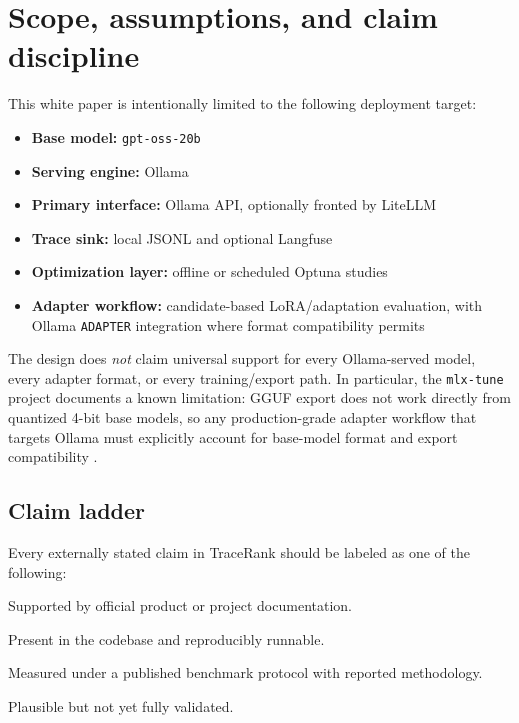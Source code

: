     \section{Scope, assumptions, and claim discipline}
    This white paper is intentionally limited to the following deployment target:
    \begin{itemize}
      \item \textbf{Base model:} \texttt{gpt-oss-20b}
      \item \textbf{Serving engine:} Ollama
      \item \textbf{Primary interface:} Ollama API, optionally fronted by LiteLLM
      \item \textbf{Trace sink:} local JSONL and optional Langfuse
      \item \textbf{Optimization layer:} offline or scheduled Optuna studies
      \item \textbf{Adapter workflow:} candidate-based LoRA/adaptation evaluation, with Ollama \texttt{ADAPTER} integration where format compatibility permits
    \end{itemize}
    
    The design does \emph{not} claim universal support for every Ollama-served model, every adapter format, or every training/export path. In particular, the \texttt{mlx-tune} project documents a known limitation: GGUF export does not work directly from quantized 4-bit base models, so any production-grade adapter workflow that targets Ollama must explicitly account for base-model format and export compatibility \cite{mlxtune_readme}.
    
    \subsection{Claim ladder}
    Every externally stated claim in TraceRank should be labeled as one of the following:
    \begin{description}[leftmargin=2.2cm,style=nextline]
      \item[Documented] Supported by official product or project documentation.
      \item[Implemented] Present in the codebase and reproducibly runnable.
      \item[Benchmarked] Measured under a published benchmark protocol with reported methodology.
      \item[Experimental] Plausible but not yet fully validated.
    \end{description}
    
